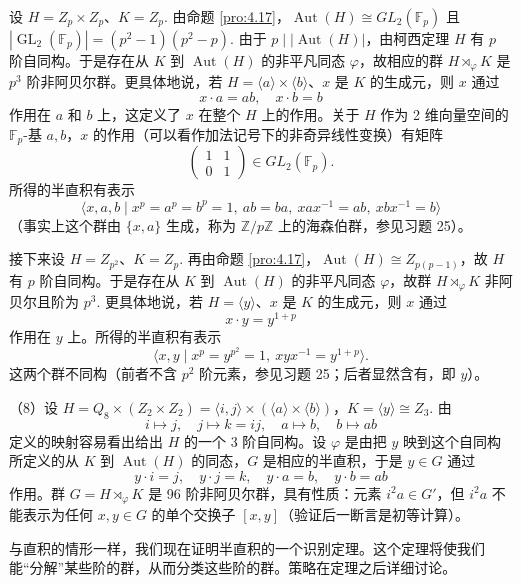 \begin{example}
设 \(H = Z_p \times Z_p\)、\(K = Z_p\). 由命题 \ref{pro:4.17}，\(\operatorname{Aut}(H) \cong GL_2(\mathbb{F}_p)\) 且 \(|\operatorname{GL}_2(\mathbb{F}_p)| = (p^2-1)(p^2-p)\). 由于 \(p \mid |\operatorname{Aut}(H)|\)，由柯西定理 \(H\) 有 \(p\) 阶自同构。于是存在从 \(K\) 到 \(\operatorname{Aut}(H)\) 的非平凡同态 \(\varphi\)，故相应的群 \(H \rtimes_\varphi K\) 是 \(p^3\) 阶非阿贝尔群。更具体地说，若 \(H = \langle a \rangle \times \langle b \rangle\)、\(x\) 是 \(K\) 的生成元，则 \(x\) 通过
\[
x \cdot a = ab, \quad x \cdot b = b
\]
作用在 \(a\) 和 \(b\) 上，这定义了 \(x\) 在整个 \(H\) 上的作用。关于 \(H\) 作为 2 维向量空间的 \(\mathbb{F}_p\)-基 \(a, b\)，\(x\) 的作用（可以看作加法记号下的非奇异线性变换）有矩阵
\[
\begin{pmatrix} 1 & 1 \\ 0 & 1 \end{pmatrix} \in GL_2(\mathbb{F}_p).
\]
所得的半直积有表示
\[
\langle x, a, b \mid x^p = a^p = b^p = 1,\ ab = ba,\ xax^{-1} = ab,\ xbx^{-1} = b \rangle
\]
（事实上这个群由 \(\{x, a\}\) 生成，称为 \(\mathbb{Z}/p\mathbb{Z}\) 上的海森伯群，参见习题 25）。

接下来设 \(H = Z_{p^2}\)、\(K = Z_p\). 再由命题 \ref{pro:4.17}，\(\operatorname{Aut}(H) \cong Z_{p(p-1)}\)，故 \(H\) 有 \(p\) 阶自同构。于是存在从 \(K\) 到 \(\operatorname{Aut}(H)\) 的非平凡同态 \(\varphi\)，故群 \(H \rtimes_\varphi K\) 非阿贝尔且阶为 \(p^3\). 更具体地说，若 \(H = \langle y \rangle\)、\(x\) 是 \(K\) 的生成元，则 \(x\) 通过
\[
x \cdot y = y^{1+p}
\]
作用在 \(y\) 上。所得的半直积有表示
\[
\langle x, y \mid x^p = y^{p^2} = 1,\ xyx^{-1} = y^{1+p} \rangle.
\]
这两个群不同构（前者不含 \(p^2\) 阶元素，参见习题 25；后者显然含有，即 \(y\)）。

（8）设 \(H = Q_8 \times (Z_2 \times Z_2) = \langle i, j \rangle \times (\langle a \rangle \times \langle b \rangle)\)，\(K = \langle y \rangle \cong Z_3\). 由
\[
i \mapsto j,\quad j \mapsto k = ij,\quad a \mapsto b,\quad b \mapsto ab
\]
定义的映射容易看出给出 \(H\) 的一个 3 阶自同构。设 \(\varphi\) 是由把 \(y\) 映到这个自同构所定义的从 \(K\) 到 \(\operatorname{Aut}(H)\) 的同态，\(G\) 是相应的半直积，于是 \(y \in G\) 通过
\[
y \cdot i = j,\quad y \cdot j = k,\quad y \cdot a = b,\quad y \cdot b = ab
\]
作用。群 \(G = H \rtimes_\varphi K\) 是 96 阶非阿贝尔群，具有性质：元素 \(i^2a \in G'\)，但 \(i^2a\) 不能表示为任何 \(x, y \in G\) 的单个交换子 \([x, y]\)（验证后一断言是初等计算）。
\end{example}

与直积的情形一样，我们现在证明半直积的一个识别定理。这个定理将使我们能“分解”某些阶的群，从而分类这些阶的群。策略在定理之后详细讨论。

